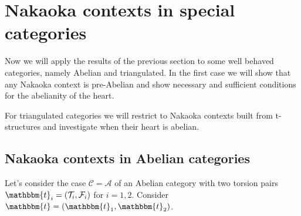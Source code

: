 













\section{Nakaoka contexts in special categories}\label{sec:nakaoka_special}

Now we will apply the results of the previous section to some well behaved categories, namely Abelian and triangulated. In the first case we will show that any Nakaoka context is pre-Abelian and show necessary and sufficient conditions for the abelianity of the heart.

For triangulated categories we will restrict to Nakaoka contexts built from t-structures and investigate when their heart is abelian.

\subsection{Nakaoka contexts in Abelian categories}

Let's consider the case $\mathscr{C}=\mathscr{A}$ of an Abelian category with
two torsion pairs $\mathbbm{t}_i=(\mathcal{T}_i,\mathcal{F}_i)$ for $i=1,2$.
Consider $\mathbbm{t}=(\mathbbm{t}_1,\mathbbm{t}_2)$.

